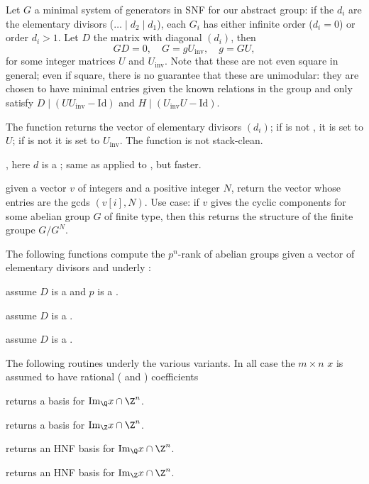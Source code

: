 Let $G$ a minimal system of generators in SNF for our abstract group:
if the $d_i$ are the elementary divisors ($\dots \mid d_2\mid d_1$), each
$G_i$ has either infinite order ($d_i = 0$) or order $d_i > 1$. Let $D$
the matrix with diagonal $(d_i)$, then
$$G D = 0,\quad G = g U_{\text{inv}},\quad g = G U,$$
for some integer matrices $U$ and $U_{\text{inv}}$. Note that these are not
even square in general; even if square, there is no guarantee that these are
unimodular: they are chosen to have minimal entries given the known relations
in the group and only satisfy $D \mid (U U_{\text{inv}} - \text{Id})$ and $H
\mid (U_{\text{inv}}U - \text{Id})$.

The function returns the vector of elementary divisors $(d_i)$; if  is
not , it is set to $U$; if  is not  it is
set to $U_{\text{inv}}$. The function is not stack-clean.

, here $d$ is a
; same as  applied to , but faster.

 given a vector $v$ of integers and a
positive integer $N$, return the vector whose entries are the gcds
$(v[i],N)$. Use case: if $v$ gives the cyclic components for some abelian
group $G$ of finite type, then this returns the structure of the finite
groupe $G/G^N$.

The following functions compute the $p^n$-rank of abelian groups given a
vector of elementary divisors and underly :

 assume $D$ is a  and $p$ is a
.

 assume $D$ is a .

 assume $D$ is a .

The following routines underly the various  variants.
In all case the $m\times n$  $x$ is assumed to have rational
( and ) coefficients

 returns a basis for
$\text{Im}_\Q x \cap \Z^n$.

 returns a basis for
$\text{Im}_\Z x \cap \Z^n$.

 returns an HNF basis for
$\text{Im}_\Q x \cap \Z^n$.

 returns an HNF basis for
$\text{Im}_\Z x \cap \Z^n$.

